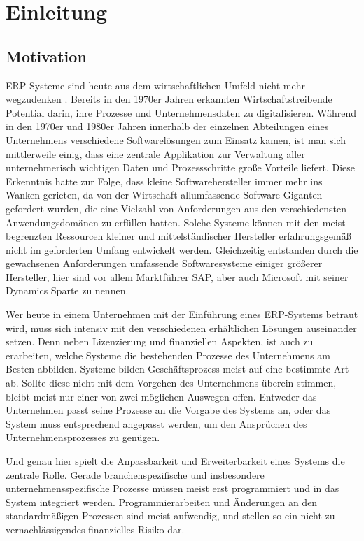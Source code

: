 \chapter{Einleitung}
\label{cha:Einleitung}

\section{Motivation}
\label{sec:Motivation}

ERP-Systeme sind heute aus dem wirtschaftlichen Umfeld nicht mehr wegzudenken \cite{WongTein2003} \cite{DuplagaMarzie2003}. Bereits in den 1970er Jahren erkannten Wirtschaftstreibende Potential darin, ihre Prozesse und Unternehmensdaten zu digitalisieren. Während in den 1970er und 1980er Jahren innerhalb der einzelnen Abteilungen eines Unternehmens verschiedene Softwarelösungen zum Einsatz kamen, ist man sich mittlerweile einig, dass eine zentrale Applikation zur Verwaltung aller unternehmerisch wichtigen Daten und Prozessschritte große Vorteile liefert. Diese Erkenntnis hatte zur Folge, dass kleine Softwarehersteller immer mehr ins Wanken gerieten, da von der Wirtschaft allumfassende Software-Giganten gefordert wurden, die eine Vielzahl von Anforderungen aus den verschiedensten Anwendungsdomänen zu erfüllen hatten. Solche Systeme können mit den meist begrenzten Ressourcen kleiner und mittelständischer Hersteller erfahrungsgemäß nicht im geforderten Umfang entwickelt werden. Gleichzeitig entstanden durch die gewachsenen Anforderungen umfassende Softwaresysteme einiger größerer Hersteller, hier sind vor allem Marktführer SAP, aber auch Microsoft mit seiner Dynamics Sparte zu nennen.

Wer heute in einem Unternehmen mit der Einführung eines ERP-Systems betraut wird, muss sich intensiv mit den verschiedenen erhältlichen Lösungen auseinander setzen\cite{WongTein2003}. Denn neben Lizenzierung und finanziellen Aspekten, ist auch zu erarbeiten, welche Systeme die bestehenden Prozesse des Unternehmens am Besten abbilden. Systeme bilden Geschäftsprozess meist auf eine bestimmte Art ab. Sollte diese nicht mit dem Vorgehen des Unternehmens überein stimmen, bleibt meist nur einer von zwei möglichen Auswegen offen. Entweder das Unternehmen passt seine Prozesse an die Vorgabe des Systems an, oder das System muss entsprechend angepasst werden, um den Ansprüchen des Unternehmensprozesses zu genügen.

Und genau hier spielt die Anpassbarkeit und Erweiterbarkeit eines Systems die zentrale Rolle. Gerade branchenspezifische und insbesondere unternehmensspezifische Prozesse müssen meist erst programmiert und in das System integriert werden. Programmierarbeiten und Änderungen an den standardmäßigen Prozessen sind meist aufwendig, und stellen so ein nicht zu vernachlässigendes finanzielles Risiko dar.

